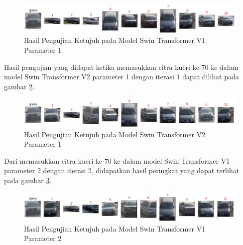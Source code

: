 \begin{figure}[h!]
  \centering
  \includegraphics[scale=0.6]{gambar/Que70V1P1IT3.png}
  \caption{Hasil Pengujian Ketujuh pada Model Swin Transformer V1 Parameter 1}
  \label{fig:hasilpengujianketujuhpadamodelswintransformerv1param1}
\end{figure}

Hasil pengujian yang didapat ketika memasukkan citra kueri ke-70 ke dalam model Swin Transformer V2 parameter 1 dengan 
iterasi 1 dapat dilihat pada gambar \ref{fig:hasilpengujianketujuhpadamodelswintransformerv2param1}.

\begin{figure}[h!]
  \centering
  \includegraphics[scale=0.6]{gambar/Que70V2P1IT1.png}
  \caption{Hasil Pengujian Ketujuh pada Model Swin Transformer V2 Parameter 1}
  \label{fig:hasilpengujianketujuhpadamodelswintransformerv2param1}
\end{figure}

Dari memasukkan citra kueri ke-70 ke dalam model Swin Transformer V1 parameter 2 dengan iterasi 2, didapatkan hasil 
peringkat yang dapat terlihat pada gambar \ref{fig:hasilpengujianketujuhpadamodelswintransformerv1param2}.

\begin{figure}[h!]
  \centering
  \includegraphics[scale=0.6]{gambar/Que70V1P2IT2.png}
  \caption{Hasil Pengujian Ketujuh pada Model Swin Transformer V1 Parameter 2}
  \label{fig:hasilpengujianketujuhpadamodelswintransformerv1param2}
\end{figure}

